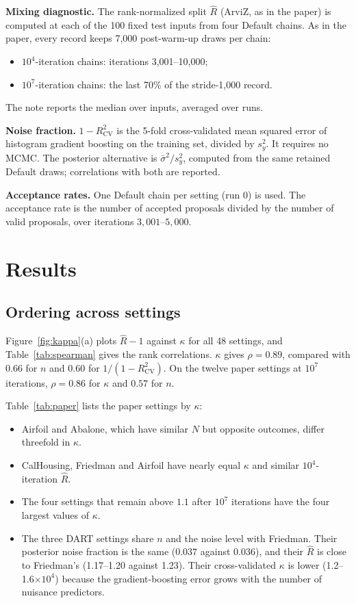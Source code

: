 \documentclass[11pt]{article}
\newcommand{\Rhat}{\hat R}
\begin{document}
\textbf{Mixing diagnostic.} The rank-normalized split $\Rhat$ (ArviZ, as in the paper) is computed at each of the 100 fixed test inputs from four Default chains. As in the paper, every record keeps 7,000 post-warm-up draws per chain:
\begin{itemize}
\item $10^4$-iteration chains: iterations 3,001--10,000;
\item $10^7$-iteration chains: the last 70\% of the stride-1,000 record.
\end{itemize}
The note reports the median over inputs, averaged over runs.

\textbf{Noise fraction.} $1-R^2_{\mathrm{CV}}$ is the 5-fold cross-validated mean squared error of histogram gradient boosting on the training set, divided by $s_y^2$. It requires no MCMC. The posterior alternative is $\bar\sigma^2/s_y^2$, computed from the same retained Default draws; correlations with both are reported.

\textbf{Acceptance rates.} One Default chain per setting (run 0) is used. The acceptance rate is the number of accepted proposals divided by the number of valid proposals, over iterations $3{,}001$--$5{,}000$.

\section{Results}
\subsection{Ordering across settings}
Figure~\ref{fig:kappa}(a) plots $\Rhat-1$ against $\kappa$ for all 48 settings, and Table~\ref{tab:spearman} gives the rank correlations. $\kappa$ gives $\rho=0.89$, compared with $0.66$ for $n$ and $0.60$ for $1/(1-R^2_{\mathrm{CV}})$. On the twelve paper settings at $10^7$ iterations, $\rho=0.86$ for $\kappa$ and $0.57$ for $n$.

Table~\ref{tab:paper} lists the paper settings by $\kappa$:
\begin{itemize}
\item Airfoil and Abalone, which have similar $N$ but opposite outcomes, differ threefold in $\kappa$.
\item CalHousing, Friedman and Airfoil have nearly equal $\kappa$ and similar $10^4$-iteration $\Rhat$.
\item The four settings that remain above $1.1$ after $10^7$ iterations have the four largest values of $\kappa$.
\item The three DART settings share $n$ and the noise level with Friedman. Their posterior noise fraction is the same ($0.037$ against $0.036$), and their $\Rhat$ is close to Friedman's (1.17--1.20 against 1.23). Their cross-validated $\kappa$ is lower (1.2--1.6$\times10^4$) because the gradient-boosting error grows with the number of nuisance predictors.
\end{itemize}
\end{document}
